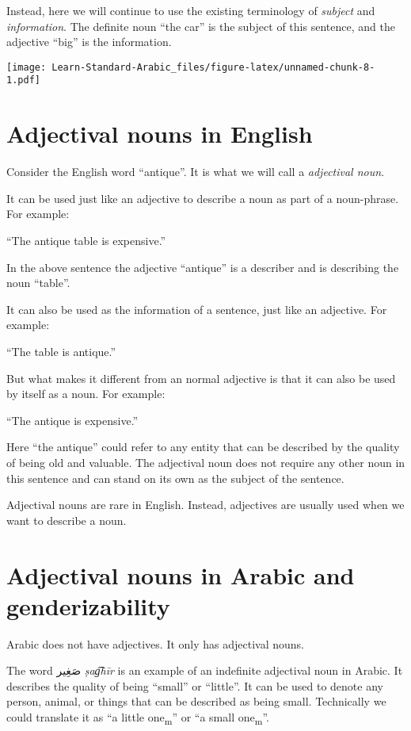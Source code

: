 \documentclass[
  10pt,
]{book}
\begin{document}
Instead, here we will continue to use the existing terminology of \emph{subject} and \emph{information}. The definite noun \enquote{the car} is the subject of this sentence, and the adjective \enquote{big} is the information.

\texttt{[image: Learn-Standard-Arabic\_files/figure-latex/unnamed-chunk-8-1.pdf]}

\section{Adjectival nouns in English}\label{adjectival-nouns-in-english}

Consider the English word \enquote{antique}. It is what we will call a \emph{adjectival noun}.

It can be used just like an adjective to describe a noun as part of a noun-phrase. For example:

\enquote{The antique table is expensive.}

In the above sentence the adjective \enquote{antique} is a describer and is describing the noun \enquote{table}.

It can also be used as the information of a sentence, just like an adjective. For example:

\enquote{The table is antique.}

But what makes it different from an normal adjective is that it can also be used by itself as a noun. For example:

\enquote{The antique is expensive.}

Here \enquote{the antique} could refer to any entity that can be described by the quality of being old and valuable. The adjectival noun does not require any other noun in this sentence and can stand on its own as the subject of the sentence.

Adjectival nouns are rare in English. Instead, adjectives are usually used when we want to describe a noun.

\section{Adjectival nouns in Arabic and genderizability}\label{adjectival-nouns-in-arabic-and-genderizability}

Arabic does not have adjectives. It only has adjectival nouns.

The word \foreignlanguage{arabic}{صَغِير} \emph{ṣag͡hīr} is an example of an indefinite adjectival noun in Arabic. It describes the quality of being \enquote{small} or \enquote{little}. It can be used to denote any person, animal, or things that can be described as being small. Technically we could translate it as \enquote{a little one\textsubscript{m}} or \enquote{a small one\textsubscript{m}}.
\end{document}
